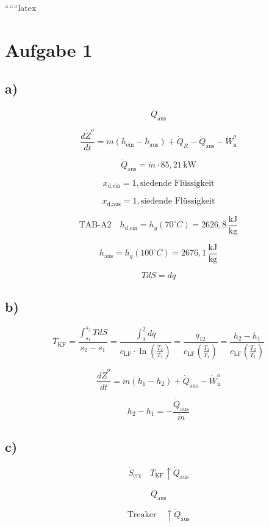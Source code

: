 
``````latex


\section*{Aufgabe 1}

\subsection*{a)}

\[
\dot{Q}_{\text{aus}}
\]

\[
\frac{d\dot{Z}^o}{dt} = \dot{m} (h_{\text{ein}} - h_{\text{aus}}) + \dot{Q}_R - \dot{Q}_{\text{aus}} - \dot{W}^o_{\text{n}}
\]

\[
\dot{Q}_{\text{aus}} = \dot{m} \cdot 85,21 \, \text{kW}
\]

\[
x_{\text{d,ein}} = 1, \text{siedende Flüssigkeit}
\]

\[
x_{\text{d,aus}} = 1, \text{siedende Flüssigkeit}
\]

\[
\text{TAB-A2} \quad h_{\text{d,ein}} = h_g(70^\circ C) = 2626,8 \, \frac{\text{kJ}}{\text{kg}}
\]

\[
h_{\text{aus}} = h_g(100^\circ C) = 2676,1 \, \frac{\text{kJ}}{\text{kg}}
\]

\[
T dS = dq
\]

\subsection*{b)}

\[
\overline{T}_{\text{KF}} = \frac{\int_{s_1}^{s_2} T dS}{s_2 - s_1} = \frac{\int_{1}^{2} dq}{c_{\text{LF}} \cdot \ln \left( \frac{T_2}{T_1} \right)} = \frac{q_{12}}{c_{\text{LF}} \left( \frac{T_2}{T_1} \right)} = \frac{h_2 - h_1}{c_{\text{LF}} \left( \frac{T_2}{T_1} \right)}
\]

\[
\frac{d\dot{Z}^o}{dt} = \dot{m} (h_1 - h_2) + \dot{Q}_{\text{aus}} - \dot{W}^o_{\text{n}}
\]

\[
h_2 - h_1 = - \frac{\dot{Q}_{\text{aus}}}{\dot{m}}
\]

\subsection*{c)}

\[
\dot{S}_{\text{erz}} \quad \overline{T}_{\text{KF}} \uparrow \dot{Q}_{\text{aus}}
\]

\[
\boxed{\dot{Q}_{\text{aus}}}
\]

\[
\text{Treaker} \quad \uparrow \dot{Q}_{\text{aus}}
\]

